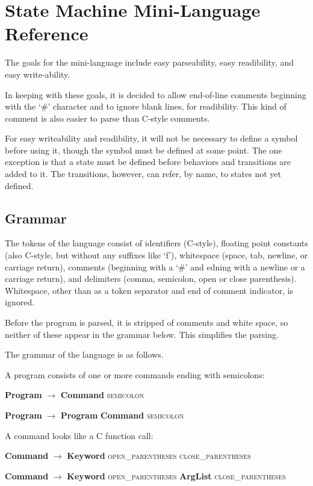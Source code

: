 \documentclass[letter,12pt]{article}
\begin{document}
\section{State Machine Mini-Language Reference}
The goals for the mini-language include easy parseability, easy readibility, and easy write-ability.

In keeping with these goals, it is decided to allow end-of-line comments beginning with the ‘\#’ character and to ignore blank lines, for readibility.  This kind of comment is also easier to parse than C-style comments.

For easy writeability and readibility, it will not be necessary to define a symbol before using it, though the symbol must be defined at some point.  The one exception is that a state must be defined before behaviors and transitions are added to it.  The transitions, however, can refer, by name, to states not yet defined.

\subsection{Grammar}

The tokens of the language consist of identifiers (C-style), floating point constants (also C-style, but without any suffixes like ‘f’), whitespace (space, tab, newline, or carriage return), comments (beginning with a ‘\#’ and edning with a newline or a carriage return), and delimiters (comma, semicolon, open or close parenthesis).  Whitespace, other than as a token separator and end of comment indicator, is ignored.  

Before the program is parsed, it is stripped of comments and white space, so neither of these appear in the grammar below.  This simplifies the parsing.


The grammar of the language is as follows.

A program consists of one or more commands ending with semicolons:

\textbf{Program} $\rightarrow$  \textbf{Command} \textsc{semicolon}

\textbf{Program} $\rightarrow$  \textbf{Program} \textbf{Command}  \textsc{semicolon}

A command looks like a C function call:


\textbf{Command} $\rightarrow$ \textbf{Keyword} \textsc{open\_parentheses} \textsc{close\_parentheses}

\textbf{Command} $\rightarrow$ \textbf{Keyword} \textsc{open\_parentheses} \textbf{ArgList} \textsc{close\_parentheses}
\end{document}
